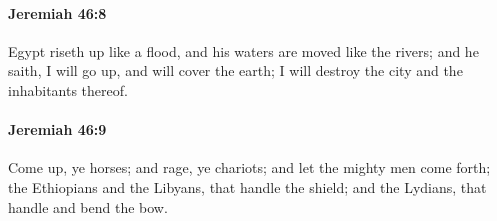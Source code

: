 		\paragraph{Jeremiah 46:8} %
			\label{JEREMIAH-46-8}

			Egypt riseth up like a flood, and his waters are moved like the rivers; and he saith, I will go up, and will cover the earth; I will destroy the city and the inhabitants thereof.


		\paragraph{Jeremiah 46:9} %
			\label{JEREMIAH-46-9}

			Come up, ye horses; and rage, ye chariots; and let the mighty men come forth; the Ethiopians and the Libyans, that handle the shield; and the Lydians, that handle and bend the bow.


